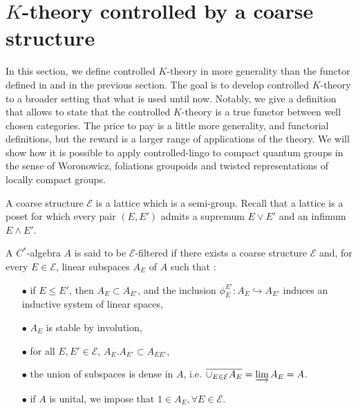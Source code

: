 \section{$K$-theory controlled by a coarse structure}

In this section, we define controlled $K$-theory in more generality than the functor defined in \cite{OY2} and in the previous section. The goal is to develop controlled $K$-theory to a broader setting that what is used until now. Notably, we give a definition that allows to state that the controlled $K$-theory is a true functor between well chosen categories. The price to pay is a little more generality, and functorial definitions, but the reward is a larger range of applications of the theory. We will show how it is possible to apply controlled-lingo to compact quantum groups in the sense of Woronowicz, foliations groupoids and twisted representations of locally compact groups.\\

\begin{definition}
A coarse structure $\mathcal E$ is a lattice which is a semi-group. %
Recall that a lattice is a poset for which every pair $(E,E')$ admits a supremum $E\vee E'$ and an infimum $E\wedge E'$.
\end{definition}

\begin{definition}
A $C^*$-algebra $A$ is said to be $\mathcal E$-filtered if there exists a coarse structure $\mathcal E$ and, for every $E\in \mathcal E$, linear subspaces $A_E$ of $A$ such that :\\
\begin{itemize}
\item[$\bullet$] if $E \leq E'$, then $A_E\subset A_{E'}$, and the inclusion $\phi_E^{E'}: A_E\hookrightarrow A_{E'}$ induces an inductive system of linear spaces,
\item[$\bullet$] $A_E$ is stable by involution,
\item[$\bullet$] for all $E,E'\in\mathcal E$, $A_E.A_{E'}\subset A_{EE'}$,
\item[$\bullet$] the union of subspaces is dense in $A$, i.e. $\overline{\cup_{E\in\mathcal E}A_E} = \varinjlim A_E = A$.
\item[$\bullet$] if $A$ is unital, we impose that $1\in A_E,\forall E\in\mathcal E$.
\end{itemize}
\end{definition}

